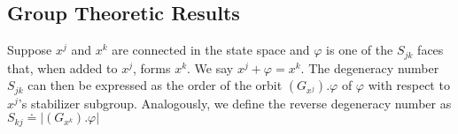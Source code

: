 %
%
%
%



\subsection{Group Theoretic Results}

Suppose $x^j$ and $x^k$ are connected in the state space and $\varphi$ is one of the $S_{jk}$ faces that, when added to $x^j$, forms $x^k$. We say $x^j + \varphi = x^k$. The degeneracy number $S_{jk}$ can then be expressed as the order of the orbit $\left(G_{x^j}\right).\varphi$ of $\varphi$ with respect to $x^j$'s stabilizer subgroup. Analogously, we define the reverse degeneracy number as $S_{kj} \doteq \left|\left(G_{x^k}\right).\varphi\right|$

